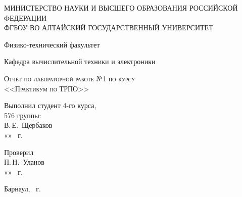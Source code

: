 \documentclass[a4paper,14pt]{extarticle}
\begin{document}
\begin{titlepage}
  \begin{center}
    \MakeUppercase{Министерство науки и высшего образования Российской Федерации} \\
    \MakeUppercase{ФГБОУ ВО Алтайский государственный университет}
    \vspace{0.25cm}
    
    Физико-технический факультет
    
    Кафедра вычислительной техники и электроники
    \vfill
    
    \textsc{Отчёт по лабораторной работе №1 по курсу \\ <<Практикум по ТРПО>>}
  \bigskip

\end{center}
\vfill

\newlength{\ML}
\hfill\begin{minipage}{0.5\textwidth}
  Выполнил студент 4-го курса, \\ 576 группы:\\
  \underline{\hspace{\ML}} В.\,Е.~Щербаков\\
  «\underline{\hspace{0.7cm}}» \underline{\hspace{2cm}} \the\year~г.
\end{minipage}%
\bigskip

\hfill\begin{minipage}{0.5\textwidth}
  Проверил\\
  \underline{\hspace{\ML}} П.\,Н.~Уланов\\
  «\underline{\hspace{0.7cm}}» \underline{\hspace{2cm}} \the\year~г.
\end{minipage}%
\vfill

\begin{center}
  Барнаул, \the\year~г.
\end{center}
\end{titlepage}

\tableofcontents

\newpage
\end{document}
